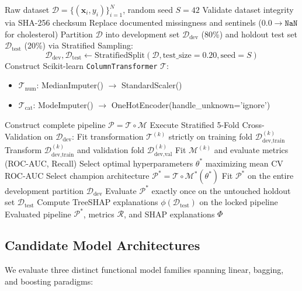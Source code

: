 \documentclass[conference]{IEEEtran}
\begin{document}
\begin{algorithm}[htbp]
\caption{Leakage-Free Stratified Dual-Cohort ML Protocol}
\label{alg:split_first}
\begin{algorithmic}[1]
\REQUIRE Raw dataset $\mathcal{D} = \{(\mathbf{x}_i, y_i)\}_{i=1}^N$, random seed $S=42$
\STATE Validate dataset integrity via SHA-256 checksum
\STATE Replace documented missingness and sentinels ($0.0 \rightarrow \texttt{NaN}$ for cholesterol)
\STATE Partition $\mathcal{D}$ into development set $\mathcal{D}_{\text{dev}}$ (80\%) and holdout test set $\mathcal{D}_{\text{test}}$ (20\%) via Stratified Sampling:
$$\mathcal{D}_{\text{dev}}, \mathcal{D}_{\text{test}} \leftarrow \text{StratifiedSplit}(\mathcal{D}, \text{test\_size}=0.20, \text{seed}=S)$$
\STATE Construct Scikit-learn \texttt{ColumnTransformer} $\mathcal{T}$:
\begin{itemize}
    \item $\mathcal{T}_{\text{num}}$: MedianImputer() $\rightarrow$ StandardScaler()
    \item $\mathcal{T}_{\text{cat}}$: ModeImputer() $\rightarrow$ OneHotEncoder(handle\_unknown='ignore')
\end{itemize}
    \STATE Construct complete pipeline $\mathcal{P} = \mathcal{T} \circ \mathcal{M}$
    \STATE Execute Stratified 5-Fold Cross-Validation on $\mathcal{D}_{\text{dev}}$:
        \STATE Fit transformation $\mathcal{T}^{(k)}$ strictly on training fold $\mathcal{D}_{\text{dev},\text{train}}^{(k)}$
        \STATE Transform $\mathcal{D}_{\text{dev},\text{train}}^{(k)}$ and validation fold $\mathcal{D}_{\text{dev},\text{val}}^{(k)}$
        \STATE Fit $\mathcal{M}^{(k)}$ and evaluate metrics (ROC-AUC, Recall)
    \ENDFOR
    \STATE Select optimal hyperparameters $\theta^*$ maximizing mean CV ROC-AUC
\ENDFOR
\STATE Select champion architecture $\mathcal{P}^* = \mathcal{T} \circ \mathcal{M}^*(\theta^*)$
\STATE Fit $\mathcal{P}^*$ on the entire development partition $\mathcal{D}_{\text{dev}}$
\STATE Evaluate $\mathcal{P}^*$ exactly once on the untouched holdout set $\mathcal{D}_{\text{test}}$
\STATE Compute TreeSHAP explanations $\phi(\mathcal{D}_{\text{test}})$ on the locked pipeline
\RETURN Evaluated pipeline $\mathcal{P}^*$, metrics $\mathcal{R}$, and SHAP explanations $\Phi$
\end{algorithmic}
\end{algorithm}

\subsection{Candidate Model Architectures}
We evaluate three distinct functional model families spanning linear, bagging, and boosting paradigms:
\end{document}
